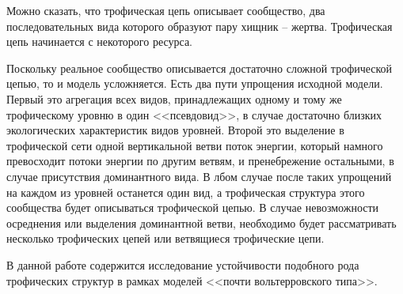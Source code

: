     Можно сказать, что трофическая цепь описывает сообщество, два последовательных вида которого образуют пару хищник -- жертва. Трофическая цепь начинается с некоторого ресурса.

    Поскольку реальное сообщество описывается достаточно сложной трофической цепью, то и модель усложняется. Есть два пути упрощения исходной модели. Первый это агрегация всех видов, принадлежащих одному и тому же трофическому уровню в один <<псевдовид>>, в случае достаточно близких экологических характеристик видов уровней. Второй это выделение в трофической сети одной вертикальной ветви поток энергии, который намного превосходит потоки энергии по другим ветвям, и пренебрежение остальными, в случае присутствия доминантного вида. В лбом случае после таких упрощений на каждом из уровней останется один вид, а трофическая структура этого сообщества будет описываться трофической цепью. В случае невозможности осреднения или выделения доминантной ветви, необходимо будет рассматривать несколько трофических цепей или ветвящиеся трофические цепи.

    В данной работе содержится исследование устойчивости подобного рода трофических структур в рамках моделей <<почти вольтерровского типа>>.